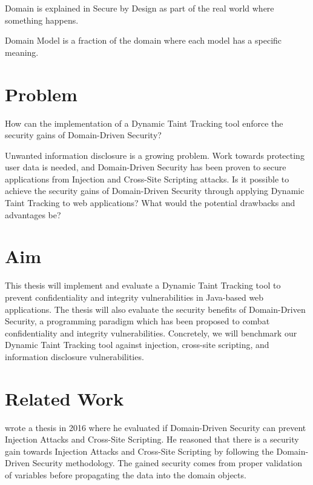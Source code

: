\begin{definition}{Domain}
    is explained in Secure by Design \parencite{sbd2018} as part of the real world where something happens.
    \\
\end{definition}

\begin{definition}{Domain Model}
    is a fraction of the domain where each model has a specific meaning.
    \\
\end{definition}


\section{Problem}
\label{Problem}
\begin{chapquote}{}
    How can the implementation of a Dynamic Taint Tracking tool enforce the security gains of Domain-Driven Security?
\end{chapquote}

\noindent
Unwanted information disclosure is a growing problem. Work towards protecting user data is needed, and Domain-Driven Security has been proven to secure applications from Injection and Cross-Site Scripting attacks. Is it possible to achieve the security gains of Domain-Driven Security through applying Dynamic Taint Tracking to web applications? What would the potential drawbacks and advantages be?


\section{Aim}
\label{Aim}
This thesis will implement and evaluate a Dynamic Taint Tracking tool to prevent confidentiality and integrity vulnerabilities in Java-based web applications. The thesis will also evaluate the security benefits of Domain-Driven Security, a programming paradigm which has been proposed to combat confidentiality and integrity vulnerabilities. Concretely, we will benchmark our Dynamic Taint Tracking tool against injection, cross-site scripting, and information disclosure vulnerabilities.


\section{Related Work}
\label{RelatedWork}
\textcite{Stendahl2016} wrote a thesis in 2016 where he evaluated if Domain-Driven Security can prevent Injection Attacks and Cross-Site Scripting. He reasoned that there is a security gain towards Injection Attacks and Cross-Site Scripting by following the Domain-Driven Security methodology. The gained security comes from proper validation of variables before propagating the data into the domain objects.

